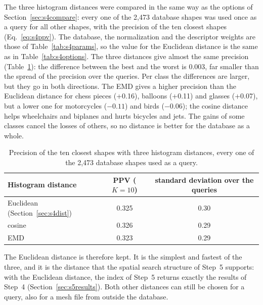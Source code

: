 \documentclass[10pt,a4paper]{article}
\begin{document}
The three histogram distances were compared in the same way as the options of Section~\ref{sec:s4compare}: every one of the
2,473 database shapes was used once as a query for all other shapes, with the precision of the ten closest shapes
(Eq.~\eqref{eq:s4ppv}). The database, the normalization and the descriptor weights are those of Table~\ref{tab:s4params}, so the
value for the Euclidean distance is the same as in Table~\ref{tab:s4options}. The three distances give almost the same precision
(Table~\ref{tab:s4metrics}): the difference between the best and the worst is 0.003, far smaller than the spread of the
precision over the queries. Per class the differences are larger, but they go in both directions. The EMD gives a higher
precision than the Euclidean distance for chess pieces (+0.16), balloons (+0.11) and glasses (+0.07), but a lower one for
motorcycles ($-0.11$) and birds ($-0.06$); the cosine distance helps wheelchairs and biplanes and hurts bicycles and jets. The
gains of some classes cancel the losses of others, so no distance is better for the database as a whole.

\begin{table}[htbp]\centering\small
\begin{tabular}{@{}lcc@{}}\toprule
Histogram distance & PPV ($K=10$) & standard deviation over the queries\\\midrule
Euclidean (Section~\ref{sec:s4dist}) & 0.325 & 0.30\\
cosine & 0.326 & 0.29\\
EMD & 0.323 & 0.29\\
\bottomrule\end{tabular}
\caption{Precision of the ten closest shapes with three histogram distances, every one of the 2,473 database shapes used as a
query.}
\label{tab:s4metrics}
\end{table}

The Euclidean distance is therefore kept. It is the simplest and fastest of the three, and it is the distance that the spatial
search structure of Step~5 supports: with the Euclidean distance, the index of Step~5 returns exactly the results of Step~4
(Section~\ref{sec:s5results}). Both other distances can still be chosen for a query, also for a mesh file from outside the
database.
\end{document}
